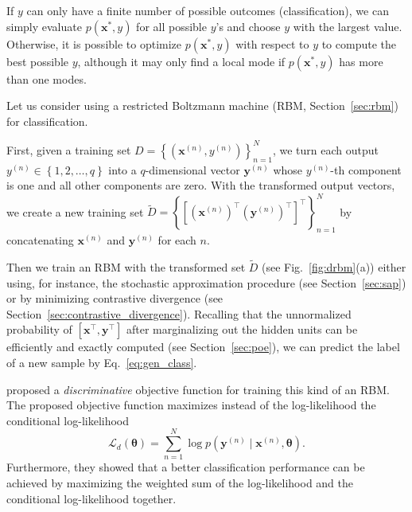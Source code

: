 \documentclass[dissertation,nocontribution,draft*]{aaltoseries}
\newcommand{\vect}[1]{\mathbf{#1}}
\newcommand{\vects}[1]{\boldsymbol{#1}}
\newcommand{\vx}[0]{\vect{x}}
\newcommand{\vy}[0]{\vect{y}}
\newcommand{\TT}[0]{{\vects{\theta}}}
\newcommand{\LL}[0]{\mathcal{L}}
\begin{document}
If $y$ can only have a finite number of possible outcomes
(classification), we can simply evaluate $p(\vx^*, y)$ for
all possible $y$'s and choose $y$ with the largest value.
Otherwise, it is possible to optimize $p(\vx^*, y)$ with
respect to $y$ to compute the best possible $y$, although it
may only find a local mode if $p(\vx^*, y)$ has more than one
modes.

Let us consider using a restricted Boltzmann machine (RBM,
Section~\ref{sec:rbm}) for classification. 

First, given a training set $D=\left\{ \left( \vx^{(n)},
y^{(n)} \right) \right\}_{n=1}^N$, we turn each output
$y^{(n)} \in \left\{ 1, 2, \dots, q \right\}$ into a
$q$-dimensional vector $\vy^{(n)}$ whose $y^{(n)}$-th
component is one and all other components are zero. With the
transformed output vectors, we create a new training set
$\tilde{D} = \left\{ \left[(\vx^{(n)})^\top (\vy^{(n)})^\top
\right]^\top \right\}_{n=1}^N$ by concatenating $\vx^{(n)}$
and $\vy^{(n)}$ for each $n$.

Then we train an RBM with the transformed set $\tilde{D}$
(see Fig.~\ref{fig:drbm}(a))
either using, for instance, the stochastic approximation
procedure (see Section~\ref{sec:sap}) or by minimizing
contrastive divergence (see
Section~\ref{sec:contrastive_divergence}). Recalling that
the unnormalized probability of $\left[ \vx^\top, \vy^\top
\right]$ after marginalizing out the hidden units can be
efficiently and exactly computed (see
Section~\ref{sec:poe}), we can predict the label of a new
sample by Eq.~\eqref{eq:gen_class}.

\citet{Larochelle2008} proposed a \textit{discriminative}
objective function for training this kind of an RBM. The proposed
objective function maximizes instead of the log-likelihood
the conditional log-likelihood 
\[
\LL_d(\TT) = \sum_{n=1}^N \log p(\vy^{(n)} \mid \vx^{(n)},
\TT).
\]
Furthermore, they showed that a better classification
performance can be achieved by maximizing the weighted sum
of the log-likelihood and the conditional log-likelihood
together.
\end{document}
